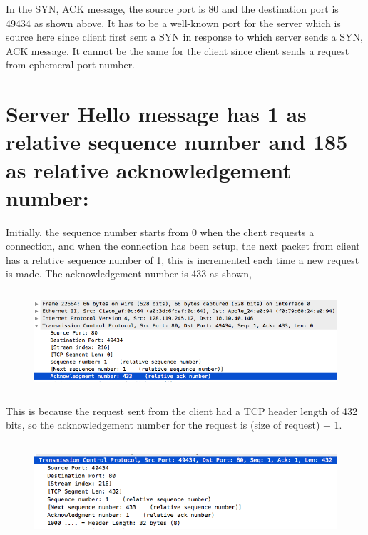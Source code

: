 \documentclass[]{report}
\begin{document}
In the SYN, ACK message, the source port is 80 and the destination port is 49434 as shown above. It has to be a well-known port for the server which is source here since client first sent a SYN in response to which server sends a SYN, ACK message. It cannot be the same for the client since client sends a request from ephemeral port number. 
\section{Server Hello message has 1 as relative sequence number and 185 as relative acknowledgement number:}
Initially, the sequence number starts from 0 when the client requests a connection, and when the connection has been setup, the next packet from client has a relative sequence number of 1, this is incremented each time a new request is made. The acknowledgement number is 433 as shown, 
\begin{figure}[H]
	\vspace{0pt}
	\includegraphics[height = 105pt, keepaspectratio]{Snapshots/q16_1.png}
\end{figure}
This is because the request sent from the client had a TCP header length of 432 bits, so the acknowledgement number for the request is (size of request) + 1.
\begin{figure}[H]
	\vspace{0pt}
	\includegraphics[height = 105pt, keepaspectratio]{Snapshots/q16_2.png}
\end{figure}
\end{document}
